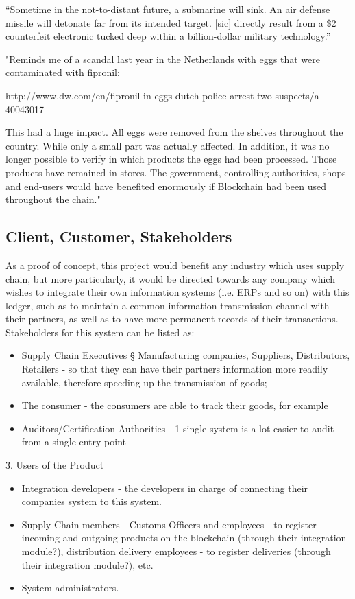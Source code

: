 	“Sometime in the not-to-distant future, a submarine will sink. An air defense missile will detonate far from its intended target. [sic] directly result from a \$2 counterfeit electronic tucked deep within a billion-dollar military technology.”
	
	"Reminds me of a scandal last year in the Netherlands with eggs that were contaminated with fipronil:
	
	http://www.dw.com/en/fipronil-in-eggs-dutch-police-arrest-two-suspects/a-40043017
	
	This had a huge impact. All eggs were removed from the shelves throughout the country. While only a small part was actually affected. In addition, it was no longer possible to verify in which products the eggs had been processed. Those products have remained in stores. The government, controlling authorities, shops and end-users would have benefited enormously if Blockchain had been used throughout the chain."
	
\subsection{Client, Customer, Stakeholders}
	
	As a proof of concept, this project would benefit any industry which uses supply chain, but more particularly, it would be directed towards any company which wishes to integrate their own information systems (i.e. ERPs and so on) with this ledger, such as to maintain a common information transmission channel with their partners, as well as to have more permanent records of their transactions. Stakeholders for this system can be listed as:
    \begin{itemize}
		\item Supply Chain Executives
			§ Manufacturing companies, Suppliers, Distributors, Retailers - so that they can have their partners information more readily available, therefore speeding up the transmission of goods;
		\item The consumer - the consumers are able to track their goods, for example
		\item Auditors/Certification Authorities - 1 single system is a lot easier to audit from a single entry point
	\end{itemize}
	3. Users of the Product
		\begin{itemize}
		\item Integration developers - the developers in charge of connecting their companies system to this system.
		\item Supply Chain members - Customs Officers and employees - to register incoming and outgoing products on the blockchain (through their integration module?), distribution delivery employees - to register deliveries (through their integration module?), etc.
		\item System administrators.
	\end{itemize}


